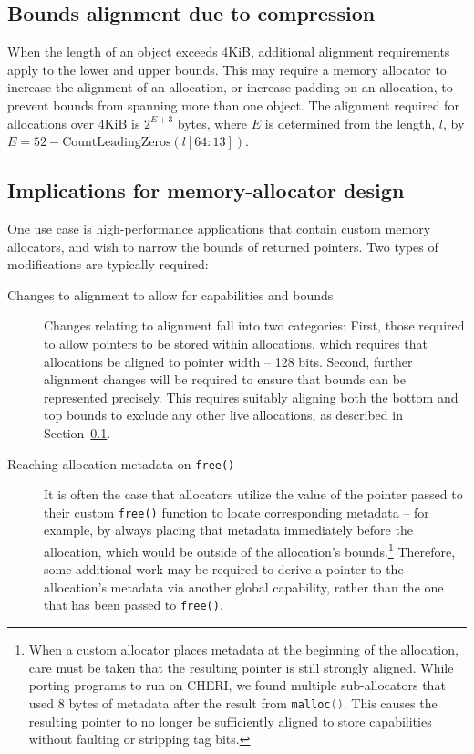 \documentclass[11pt]{article}
\newcommand{\ccode}[1]{\lstinline[language={C},basicstyle=\small\ttfamily]{#1}}
\newcommand{\cfunc}[1]{\ccode{#1()}}
\newcommand{\note}[2]{{\color{blue}[ Note: #1 - #2]}}
\renewcommand{\note}[2]{}
\begin{document}
\subsection{Bounds alignment due to compression}
\label{sec:bounds_alignment}

When the length of an object exceeds 4KiB, additional alignment requirements
apply to the lower and upper bounds.
This may require a memory allocator to increase the alignment of an
allocation, or increase padding on an allocation, to prevent bounds from
spanning more than one object.
The alignment required for allocations over 4KiB is $2^{E+3}$ bytes, where
$E$ is determined from the length, $l$, by
$E = 52 - \textrm{CountLeadingZeros}(l[64:13])$.

\subsection{Implications for memory-allocator design}

One use case is high-performance applications that contain custom memory
allocators, and wish to narrow the bounds of returned pointers.
Two types of modifications are typically required:

\begin{description}
\item[Changes to alignment to allow for capabilities and bounds]
  Changes relating to alignment fall into two categories:
  First, those required to allow pointers to be stored within allocations,
  which requires that allocations be aligned to pointer width -- 128 bits.
  Second, further alignment changes will be required to ensure that bounds can
  be represented precisely.
  This requires suitably aligning both the bottom and top bounds to exclude
  any other live allocations, as described in
  Section~\ref{sec:bounds_alignment}.

\item[Reaching allocation metadata on \texttt{free()}]
  It is often the case that allocators utilize the value of the pointer passed
  to their custom \texttt{free()} function to locate corresponding metadata --
  for example, by always placing that metadata immediately before the
  allocation, which would be outside of the allocation's bounds.\footnote{%
  When a custom allocator places metadata at the beginning of the allocation,
  care must be taken that the resulting pointer is still strongly aligned.
  While porting programs to run on CHERI, we found multiple sub-allocators
  that used 8 bytes of metadata after the result from \cfunc{malloc}.
  This causes the resulting pointer to no longer be sufficiently aligned to
  store capabilities without faulting or stripping tag bits.
  \note{Does CHERI ISAv7 still fault in any of these scenarios?}{nwf}
  }
  Therefore, some additional work may be required to derive a pointer to the
  allocation's metadata via another global capability, rather than the one
  that has been passed to \texttt{free()}.
\end{description}
\end{document}
